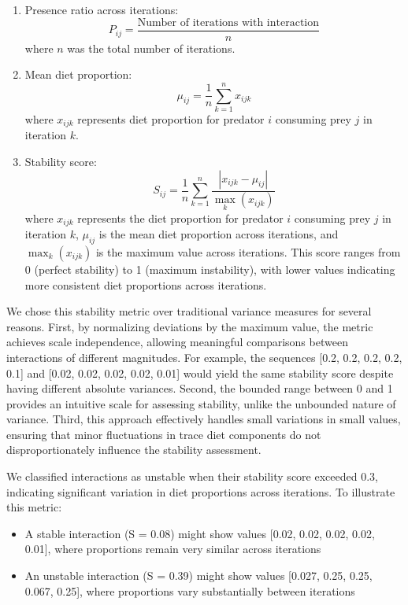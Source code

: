 \begin{enumerate}
    \item Presence ratio across iterations:
    \[
    P_{ij} = \frac{\text{Number of iterations with interaction}}{n}
    \]
    where $n$ was the total number of iterations.

    \item Mean diet proportion:
    \[
    \mu_{ij} = \frac{1}{n}\sum_{k=1}^{n} x_{ijk}
    \]
    where $x_{ijk}$ represents diet proportion for predator $i$ consuming prey $j$ in iteration $k$.

    \item Stability score:
    \[
    S_{ij} = \frac{1}{n}\sum_{k=1}^{n} \frac{|x_{ijk} - \mu_{ij}|}{\max_{k}(x_{ijk})}
    \]
    where $x_{ijk}$ represents the diet proportion for predator $i$ consuming prey $j$ in iteration $k$, $\mu_{ij}$ is the mean diet proportion across iterations, and $\max_{k}(x_{ijk})$ is the maximum value across iterations. This score ranges from 0 (perfect stability) to 1 (maximum instability), with lower values indicating more consistent diet proportions across iterations.
\end{enumerate}

We chose this stability metric over traditional variance measures for several reasons. First, by normalizing deviations by the maximum value, the metric achieves scale independence, allowing meaningful comparisons between interactions of different magnitudes. For example, the sequences [0.2, 0.2, 0.2, 0.2, 0.1] and [0.02, 0.02, 0.02, 0.02, 0.01] would yield the same stability score despite having different absolute variances. Second, the bounded range between 0 and 1 provides an intuitive scale for assessing stability, unlike the unbounded nature of variance. Third, this approach effectively handles small variations in small values, ensuring that minor fluctuations in trace diet components do not disproportionately influence the stability assessment.

We classified interactions as unstable when their stability score exceeded 0.3, indicating significant variation in diet proportions across iterations. To illustrate this metric:

\begin{itemize}
    \item A stable interaction (S = 0.08) might show values [0.02, 0.02, 0.02, 0.02, 0.01], where proportions remain very similar across iterations
    \item An unstable interaction (S = 0.39) might show values [0.027, 0.25, 0.25, 0.067, 0.25], where proportions vary substantially between iterations
\end{itemize}

